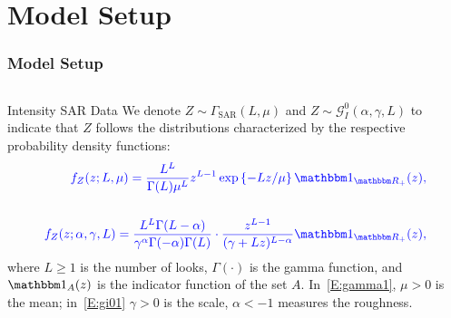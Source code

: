 \documentclass[aspectratio=169,10pt]{beamer}
\begin{document}
\section{Model Setup}
\begin{frame} \frametitle{\large{Model Setup}}\vspace{0.4cm}	

 \justifying
\begin{columns}[T,onlytextwidth]
    \begin{column}{.99\textwidth}
			\begin{exampleblock}{Intensity SAR Data}\vspace{0.4cm}	
			\justifying
We denote
\(Z \sim \Gamma_{\text{SAR}}(L, \mu)\) and
\(Z \sim \mathcal{G}_I^0(\alpha, \gamma, L)\) to indicate that \(Z\)
follows the distributions characterized by the respective probability
density functions:
\begin{align}%
 \textcolor[rgb]{0,0,1}{f_Z(z;L, \mu)=\frac{L^L}{\Gamma(L)\mu^L}z^{L-1}\exp\left\{-Lz/\mu\right\} \mathbbm 1_{\mathbbm R_+}(z), \label{E:gamma1}}\\ \nonumber\\
\textcolor[rgb]{0,0,1}{f_Z(z; \alpha, \gamma, L)=\frac{L^L\Gamma(L-\alpha)}{\gamma^{\alpha}\Gamma(-\alpha)\Gamma(L)}\cdot\frac{z^{L-1}}{(\gamma+Lz)^{L-\alpha}} \mathbbm 1_{\mathbbm R_+}(z),\label{E:gi01}}    
\end{align}
where \(L \geq 1\) is the number of looks, \(\Gamma(\cdot)\)
is the gamma function, and \(\mathbbm 1_{A}(z)\) is the indicator
function of the set \(A\). 
In~\eqref{E:gamma1}, \(\mu > 0\) is the mean;
in~\eqref{E:gi01} \(\gamma > 0\) is the scale, \(\alpha < -1\) measures
the roughness.
	\end{exampleblock}
	\
		
    \end{column}
    
\end{columns}\vspace{0.2cm}


\end{frame} 
\end{document}
